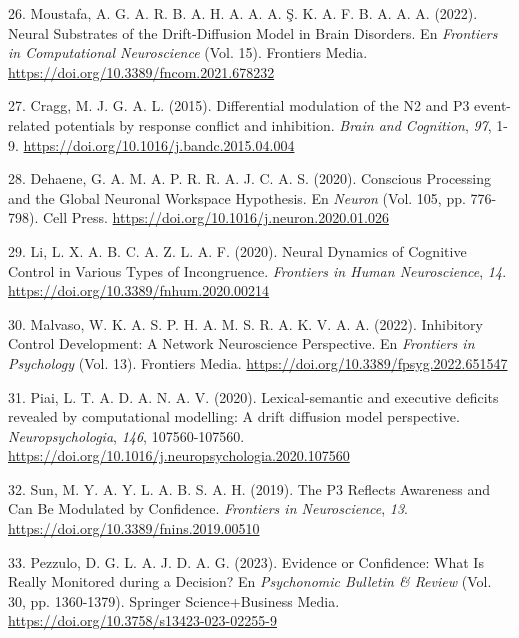\documentclass[
  spanish,
  10pt,
]{article}
\newlength{\cslhangindent}
\newenvironment{CSLReferences}[2] %
 {\begin{list}{}{%
  \setlength{\itemindent}{0pt}
  \setlength{\leftmargin}{0pt}
  \setlength{\parsep}{0pt}
  \ifodd #1
   \setlength{\leftmargin}{\cslhangindent}
   \setlength{\itemindent}{-1\cslhangindent}
  \fi
  \setlength{\itemsep}{#2\baselineskip}}}
 {\end{list}}
\begin{document}
\begin{CSLReferences}{1}{0}
26. Moustafa, A. G. A. R. B. A. H. A. A. A. Ş. K. A. F. B. A. A. A.
(2022). Neural Substrates of the Drift-Diffusion Model in Brain
Disorders. En \emph{Frontiers in Computational Neuroscience} (Vol. 15).
Frontiers Media. \url{https://doi.org/10.3389/fncom.2021.678232}

27. Cragg, M. J. G. A. L. (2015). Differential modulation of the N2 and
P3 event-related potentials by response conflict and inhibition.
\emph{Brain and Cognition}, \emph{97}, 1-9.
\url{https://doi.org/10.1016/j.bandc.2015.04.004}

28. Dehaene, G. A. M. A. P. R. R. A. J. C. A. S. (2020). Conscious
Processing and the Global Neuronal Workspace Hypothesis. En
\emph{Neuron} (Vol. 105, pp. 776-798). Cell Press.
\url{https://doi.org/10.1016/j.neuron.2020.01.026}

29. Li, L. X. A. B. C. A. Z. L. A. F. (2020). Neural Dynamics of
Cognitive Control in Various Types of Incongruence. \emph{Frontiers in
Human Neuroscience}, \emph{14}.
\url{https://doi.org/10.3389/fnhum.2020.00214}

30. Malvaso, W. K. A. S. P. H. A. M. S. R. A. K. V. A. A. (2022).
Inhibitory Control Development: A Network Neuroscience Perspective. En
\emph{Frontiers in Psychology} (Vol. 13). Frontiers Media.
\url{https://doi.org/10.3389/fpsyg.2022.651547}

31. Piai, L. T. A. D. A. N. A. V. (2020). Lexical-semantic and executive
deficits revealed by computational modelling: A drift diffusion model
perspective. \emph{Neuropsychologia}, \emph{146}, 107560-107560.
\url{https://doi.org/10.1016/j.neuropsychologia.2020.107560}

32. Sun, M. Y. A. Y. L. A. B. S. A. H. (2019). The P3 Reflects Awareness
and Can Be Modulated by Confidence. \emph{Frontiers in Neuroscience},
\emph{13}. \url{https://doi.org/10.3389/fnins.2019.00510}

33. Pezzulo, D. G. L. A. J. D. A. G. (2023). Evidence or Confidence:
What Is Really Monitored during a Decision? En \emph{Psychonomic
Bulletin \& Review} (Vol. 30, pp. 1360-1379). Springer Science+Business
Media. \url{https://doi.org/10.3758/s13423-023-02255-9}


\end{CSLReferences}
\end{document}
